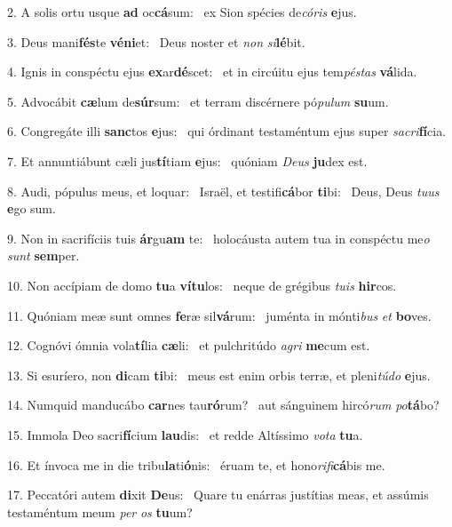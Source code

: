 2. A solis ortu usque \textbf{ad} oc\textbf{cá}sum: \ast\  ex Sion spécies de\textit{có}\textit{ris} \textbf{e}jus.\

3. Deus mani\textbf{fés}te \textbf{vé}\textbf{ni}et: \ast\  Deus noster et \textit{non} \textit{si}\textbf{lé}bit.\

4. Ignis in conspéctu ejus \textbf{ex}ar\textbf{dé}scet: \ast\  et in circúitu ejus tem\textit{pés}\textit{tas} \textbf{vá}lida.\

5. Advocábit \textbf{cæ}lum de\textbf{súr}sum: \ast\  et terram discérnere pó\textit{pu}\textit{lum} \textbf{su}um.\

6. Congregáte illi \textbf{sanc}tos \textbf{e}jus: \ast\  qui órdinant testaméntum ejus super \textit{sa}\textit{cri}\textbf{fí}cia.\

7. Et annuntiábunt cæli jus\textbf{tí}tiam \textbf{e}jus: \ast\  quóniam \textit{De}\textit{us} \textbf{ju}dex est.\

8. Audi, pópulus meus, et loquar: \dag\  Israël, et testifi\textbf{cá}bor \textbf{ti}bi: \ast\  Deus, Deus \textit{tu}\textit{us} \textbf{e}go sum.\

9. Non in sacrifíciis tuis \textbf{ár}gu\textbf{am} te: \ast\  holocáusta autem tua in conspéctu me\textit{o} \textit{sunt} \textbf{sem}per.\

10. Non accípiam de domo \textbf{tu}a \textbf{ví}\textbf{tu}los: \ast\  neque de grégibus \textit{tu}\textit{is} \textbf{hir}cos.\

11. Quóniam meæ sunt omnes \textbf{fe}ræ sil\textbf{vá}rum: \ast\  juménta in mónti\textit{bus} \textit{et} \textbf{bo}ves.\

12. Cognóvi ómnia vola\textbf{tí}lia \textbf{cæ}li: \ast\  et pulchritúdo \textit{a}\textit{gri} \textbf{me}cum est.\

13. Si esuríero, non \textbf{di}cam \textbf{ti}bi: \ast\  meus est enim orbis terræ, et pleni\textit{tú}\textit{do} \textbf{e}jus.\

14. Numquid manducábo \textbf{car}nes tau\textbf{ró}rum? \ast\  aut sánguinem hircó\textit{rum} \textit{po}\textbf{tá}bo?\

15. Immola Deo sacri\textbf{fí}cium \textbf{lau}dis: \ast\  et redde Altíssimo \textit{vo}\textit{ta} \textbf{tu}a.\

16. Et ínvoca me in die tribu\textbf{la}ti\textbf{ó}nis: \ast\  éruam te, et hono\textit{ri}\textit{fi}\textbf{cá}bis me.\

17. Peccatóri autem \textbf{di}xit \textbf{De}us: \ast\  Quare tu enárras justítias meas, et assúmis testaméntum meum \textit{per} \textit{os} \textbf{tu}um?\

